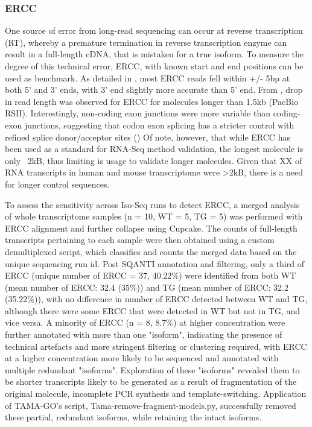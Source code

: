 \subsubsection{ERCC}
One source of error from long-read sequencing can occur at reverse transcription (RT), whereby a premature termination in reverse transcription enzyme can result in a full-length cDNA, that is mistaken for a true isoform. To measure the degree of this technical error, ERCC, with known start and end positions can be used as benchmark. As detailed in \cite{Karlsson2017}, most ERCC reads fell within +/- 5bp at both 5' and 3' ends, with 3' end slightly more accurate than 5' end. From \cite{Sharon2013}, drop in read length was observed for ERCC for molecules longer than 1.5kb (PacBio RSII). Interestingly, non-coding exon junctions were more variable than coding-exon junctions, suggesting that codon exon splicing has a stricter control with refined splice donor/acceptor sites (\cite{Karlsson2017}) 
Of note, however, that while ERCC has been used as a standard for RNA-Seq method validation, the longest molecule is only ~2kB, thus limiting is usage to validate longer molecules. Given that XX of RNA transcripts in human and mouse transcriptome were >2kB, there is a need for longer control sequences. 

To assess the sensitivity across Iso-Seq runs to detect ERCC, a merged analysis of whole transcriptome samples (n = 10, WT = 5, TG = 5) was performed with ERCC alignment and further collapse using Cupcake. The counts of full-length transcripts pertaining to each sample were then obtained using a custom demultiplexed script, which classifies and counts the merged data based on the unique sequencing run id. Post SQANTI annotation and filtering, only a third of ERCC (unique number of ERCC = 37, 40.22\%) were identified from both WT (mean number of ERCC: 32.4 (35\%)) and TG (mean number of ERCC: 32.2 (35.22\%)), with no difference in number of ERCC detected between WT and TG, although there were some ERCC that were detected in WT but not in TG, and vice versa. A minority of ERCC (n = 8, 8.7\%) at higher concentration were further annotated with more than one "isoform", indicating the presence of technical artefacts and more stringent filtering or clustering required, with ERCC at a higher concentration more likely to be sequenced and annotated with multiple redundant "isoforms". Exploration of these "isoforms" revealed them to be shorter transcripts likely to be generated as a result of fragmentation of the original molecule, incomplete PCR synthesis and template-switching. Application of TAMA-GO's script, Tama-remove-fragment-models.py, successfully removed these partial, redundant isoforms, while retaining the intact isoforms. 

